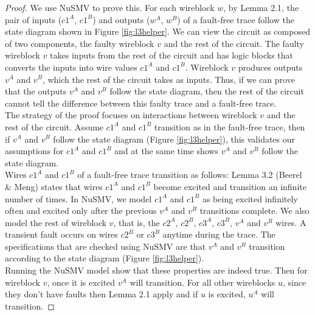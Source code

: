 \documentclass[12pt]{report}
\begin{document}
\begin{proof}
We use NuSMV to prove this. For each wireblock $w$, by Lemma 2.1, the pair of inputs ($c1^A$, $c1^B$) and outputs ($w^A$, $w^B$) of a fault-free trace follow the state diagram shown in Figure \ref{fig:l3helper}. We can view the circuit as composed of two components, the faulty wireblock $v$ and the rest of the circuit. The faulty wireblock $v$ takes inputs from the rest of the circuit and has logic blocks that converts the inputs into wire values $c1^A$ and $c1^B$. Wireblock $v$ produces outputs $v^A$ and $v^B$, which the rest of the circuit takes as inputs. Thus, if we can prove that the outputs $v^A$ and $v^B$ follow the state diagram, then the rest of the circuit cannot tell the difference between this faulty trace and a fault-free trace. \\

The strategy of the proof focuses on interactions between wireblock $v$ and the rest of the circuit. Assume $c1^A$ and $c1^B$ transition as in the fault-free trace, then if $v^A$ and $v^B$ follow the state diagram (Figure \ref{fig:l3helper}), this validates our assumptions for $c1^A$ and $c1^B$ and at the same time shows $v^A$ and $v^B$ follow the state diagram. \\

Wires $c1^A$ and $c1^B$ of a fault-free trace transition as follows: Lemma 3.2 (Beerel \& Meng) states that wires $c1^A$ and $c1^B$ become excited and transition an infinite number of times. In NuSMV, we model $c1^A$ and $c1^B$ as being excited infinitely often and excited only after the previous $v^A$ and $v^B$ transitions complete. We also model the rest of wireblock $v$, that is, the $c2^A$, $c2^B$, $c3^A$, $c3^B$, $v^A$ and $v^B$ wires. A transient fault occurs on wires $c2^B$ or $c3^B$ anytime during the trace. The specifications that are checked using NuSMV are that $v^A$ and $v^B$ transition according to the state diagram (Figure \ref{fig:l3helper}). \\

Running the NuSMV model show that these properties are indeed true. Then for wireblock $v$, once it is excited $v^A$ will transition. For all other wireblocks $u$, since they don't have faults then Lemma 2.1 apply and if $u$ is excited, $u^A$ will transition. 


\end{proof}
\end{document}
